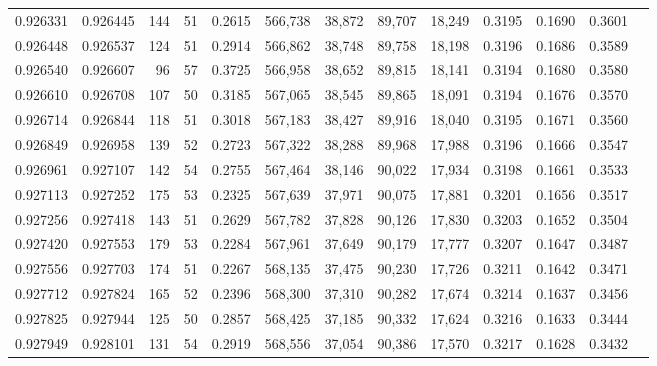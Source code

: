 \begin{tabular}{rrrrrrrrrrrrr}
0.926331 & 0.926445 &   144 &  51 &                                     0.2615 & 566,738 &  38,872 &  89,707 &  18,249 & 0.3195 & 0.1690 & 0.3601 \\
0.926448 & 0.926537 &   124 &  51 &                                     0.2914 & 566,862 &  38,748 &  89,758 &  18,198 & 0.3196 & 0.1686 & 0.3589 \\
0.926540 & 0.926607 &    96 &  57 &                                     0.3725 & 566,958 &  38,652 &  89,815 &  18,141 & 0.3194 & 0.1680 & 0.3580 \\
0.926610 & 0.926708 &   107 &  50 &                                     0.3185 & 567,065 &  38,545 &  89,865 &  18,091 & 0.3194 & 0.1676 & 0.3570 \\
0.926714 & 0.926844 &   118 &  51 &                                     0.3018 & 567,183 &  38,427 &  89,916 &  18,040 & 0.3195 & 0.1671 & 0.3560 \\
0.926849 & 0.926958 &   139 &  52 &                                     0.2723 & 567,322 &  38,288 &  89,968 &  17,988 & 0.3196 & 0.1666 & 0.3547 \\
0.926961 & 0.927107 &   142 &  54 &                                     0.2755 & 567,464 &  38,146 &  90,022 &  17,934 & 0.3198 & 0.1661 & 0.3533 \\
0.927113 & 0.927252 &   175 &  53 &                                     0.2325 & 567,639 &  37,971 &  90,075 &  17,881 & 0.3201 & 0.1656 & 0.3517 \\
0.927256 & 0.927418 &   143 &  51 &                                     0.2629 & 567,782 &  37,828 &  90,126 &  17,830 & 0.3203 & 0.1652 & 0.3504 \\
0.927420 & 0.927553 &   179 &  53 &                                     0.2284 & 567,961 &  37,649 &  90,179 &  17,777 & 0.3207 & 0.1647 & 0.3487 \\
0.927556 & 0.927703 &   174 &  51 &                                     0.2267 & 568,135 &  37,475 &  90,230 &  17,726 & 0.3211 & 0.1642 & 0.3471 \\
0.927712 & 0.927824 &   165 &  52 &                                     0.2396 & 568,300 &  37,310 &  90,282 &  17,674 & 0.3214 & 0.1637 & 0.3456 \\
0.927825 & 0.927944 &   125 &  50 &                                     0.2857 & 568,425 &  37,185 &  90,332 &  17,624 & 0.3216 & 0.1633 & 0.3444 \\
0.927949 & 0.928101 &   131 &  54 &                                     0.2919 & 568,556 &  37,054 &  90,386 &  17,570 & 0.3217 & 0.1628 & 0.3432 \\

\end{tabular}
